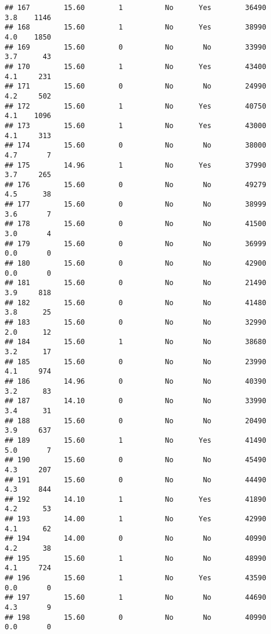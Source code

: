 \documentclass[
]{article}
\begin{document}
\begin{verbatim}
## 167        15.60        1          No      Yes        36490         3.8    1146
## 168        15.60        1          No      Yes        38990         4.0    1850
## 169        15.60        0          No       No        33990         3.7      43
## 170        15.60        1          No      Yes        43400         4.1     231
## 171        15.60        0          No       No        24990         4.2     502
## 172        15.60        1          No      Yes        40750         4.1    1096
## 173        15.60        1          No      Yes        43000         4.1     313
## 174        15.60        0          No       No        38000         4.7       7
## 175        14.96        1          No      Yes        37990         3.7     265
## 176        15.60        0          No       No        49279         4.5      38
## 177        15.60        0          No       No        38999         3.6       7
## 178        15.60        0          No       No        41500         3.0       4
## 179        15.60        0          No       No        36999         0.0       0
## 180        15.60        0          No       No        42900         0.0       0
## 181        15.60        0          No       No        21490         3.9     818
## 182        15.60        0          No       No        41480         3.8      25
## 183        15.60        0          No       No        32990         2.0      12
## 184        15.60        1          No       No        38680         3.2      17
## 185        15.60        0          No       No        23990         4.1     974
## 186        14.96        0          No       No        40390         3.2      83
## 187        14.10        0          No       No        33990         3.4      31
## 188        15.60        0          No       No        20490         3.9     637
## 189        15.60        1          No      Yes        41490         5.0       7
## 190        15.60        0          No       No        45490         4.3     207
## 191        15.60        0          No       No        44490         4.3     844
## 192        14.10        1          No      Yes        41890         4.2      53
## 193        14.00        1          No      Yes        42990         4.1      62
## 194        14.00        0          No       No        40990         4.2      38
## 195        15.60        1          No       No        48990         4.1     724
## 196        15.60        1          No      Yes        43590         0.0       0
## 197        15.60        1          No       No        44690         4.3       9
## 198        15.60        0          No       No        40990         0.0       0

\end{verbatim}
\end{document}
